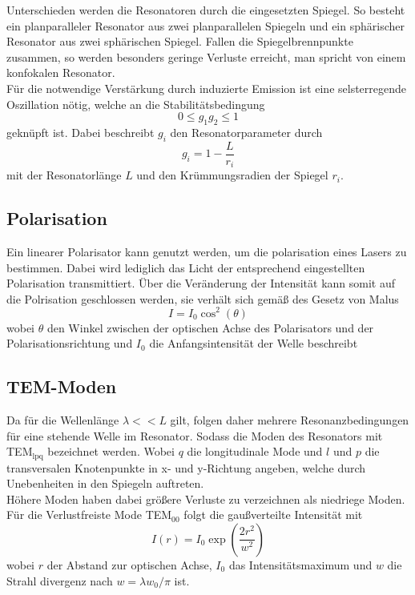 Unterschieden werden die Resonatoren durch die eingesetzten Spiegel. So besteht ein planparalleler Resonator aus zwei planparallelen Spiegeln und ein sphärischer Resonator aus zwei sphärischen Spiegel.
Fallen die Spiegelbrennpunkte zusammen, so werden besonders geringe Verluste erreicht, man spricht von einem konfokalen Resonator.\\
Für die notwendige Verstärkung durch induzierte Emission ist eine selsterregende Oszillation nötig, welche an die Stabilitätsbedingung
\begin{equation}
    0 \leq g_1 g_2\leq 1
    \label{eq:stabil}
\end{equation}
geknüpft ist. Dabei beschreibt $g_i$ den Resonatorparameter durch
\begin{equation}
    g_i=1-\frac{L}{r_i}
\end{equation}
mit der Resonatorlänge $L$ und den Krümmungsradien der Spiegel $r_i$.\\
\subsection{Polarisation}
Ein linearer Polarisator kann genutzt werden, um die polarisation eines Lasers zu bestimmen. Dabei wird lediglich das Licht der entsprechend eingestellten Polarisation transmittiert.
Über die Veränderung der Intensität kann somit auf die Polrisation geschlossen werden, sie verhält sich gemäß des Gesetz von Malus
\begin{equation}
    I=I_0\cos^2(\theta)
\end{equation}
wobei $\theta$ den Winkel zwischen der optischen Achse des Polarisators und der Polarisationsrichtung und $I_0$ die Anfangsintensität der Welle beschreibt

\subsection{TEM-Moden}
Da für die Wellenlänge $\lambda<<L$ gilt, folgen daher mehrere Resonanzbedingungen für eine stehende Welle im Resonator.
Sodass die Moden des Resonators mit TEM$_{\text{lpq}}$ bezeichnet werden. Wobei $q$ die longitudinale Mode und $l$ und $p$
die transversalen Knotenpunkte in x- und y-Richtung angeben, welche durch Unebenheiten in den Spiegeln auftreten.\\
Höhere Moden haben dabei größere Verluste zu verzeichnen als niedriege Moden. Für die Verlustfreiste Mode TEM$_{00}$ folgt die  gaußverteilte
Intensität mit
\begin{equation}
    I(r)=I_0\exp(\frac{2r^2}{w^2})
\end{equation}
wobei $r$ der Abstand zur optischen Achse, $I_0$ das Intensitätsmaximum und $w$ die Strahl divergenz nach $w=\lambda w_0/\pi$ ist.
